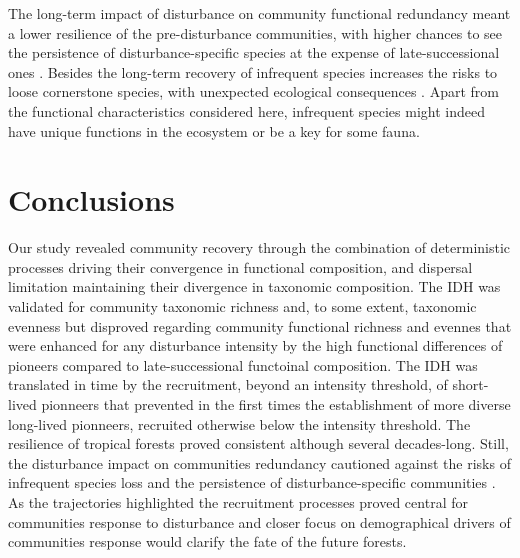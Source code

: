 \documentclass[fleqn,10pt]{ArtEcoFoG} %
\begin{document}
The long-term impact of disturbance on community functional redundancy
meant a lower resilience of the pre-disturbance communities, with higher
chances to see the persistence of disturbance-specific species at the
expense of late-successional ones \citep{Haddad2008}. Besides the
long-term recovery of infrequent species increases the risks to loose
cornerstone species, with unexpected ecological consequences
\citep{Jones1994, Chazdon2003a, Diaz2005}. Apart from the functional
characteristics considered here, infrequent species might indeed have
unique functions in the ecosystem or be a key for some fauna.

\section{Conclusions}\label{conclusions}

Our study revealed community recovery through the combination of
deterministic processes driving their convergence in functional
composition, and dispersal limitation maintaining their divergence in
taxonomic composition. The IDH was validated for community taxonomic
richness and, to some extent, taxonomic evenness but disproved regarding
community functional richness and evennes that were enhanced for any
disturbance intensity by the high functional differences of pioneers
compared to late-successional functoinal composition. The IDH was
translated in time by the recruitment, beyond an intensity threshold, of
short-lived pionneers that prevented in the first times the
establishment of more diverse long-lived pionneers, recruited otherwise
below the intensity threshold. The resilience of tropical forests proved
consistent although several decades-long. Still, the disturbance impact
on communities redundancy cautioned against the risks of infrequent
species loss and the persistence of disturbance-specific communities
\citep{Gourlet-Fleury2005}. As the trajectories highlighted the
recruitment processes proved central for communities response to
disturbance and closer focus on demographical drivers of communities
response would clarify the fate of the future forests.



\makeatletter

\makeatother


\end{document}
